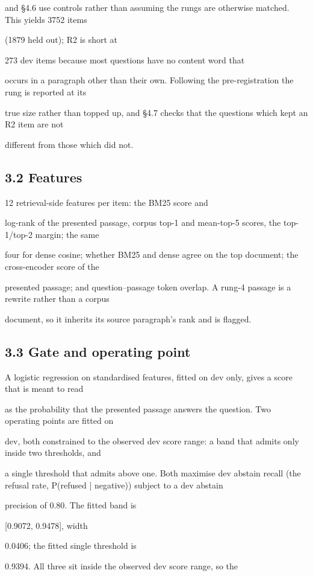 and §4.6 use controls rather than assuming the rungs are otherwise matched. This yields 3752 items

(1879 held out); R2 is short at

273 dev items because most questions have no content word that

occurs in a paragraph other than their own. Following the pre-registration the rung is reported at its

true size rather than topped up, and §4.7 checks that the questions which kept an R2 item are not

different from those which did not.

\subsection{3.2 Features}
12 retrieval-side features per item: the BM25 score and

log-rank of the presented passage, corpus top-1 and mean-top-5 scores, the top-1/top-2 margin; the same

four for dense cosine; whether BM25 and dense agree on the top document; the cross-encoder score of the

presented passage; and question--passage token overlap. A rung-4 passage is a rewrite rather than a corpus

document, so it inherits its source paragraph's rank and is flagged.

\subsection{3.3 Gate and operating point}
A logistic regression on standardised features, fitted on dev only, gives a score that is meant to read

as the probability that the presented passage answers the question. Two operating points are fitted on

dev, both constrained to the observed dev score range: a band that admits only inside two thresholds, and

a single threshold that admits above one. Both maximise dev abstain recall (the refusal rate, P(refused | negative)) subject to a dev abstain

precision of 0.80. The fitted band is

[0.9072, 0.9478], width

0.0406; the fitted single threshold is

0.9394. All three sit inside the observed dev score range, so the

